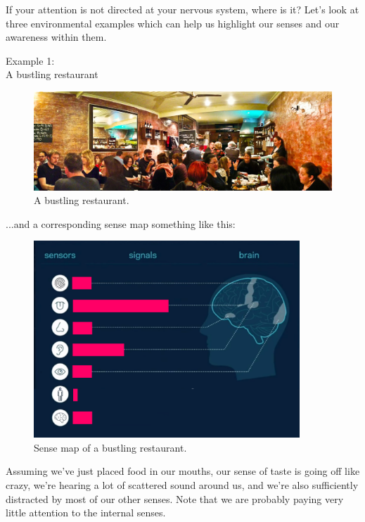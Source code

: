 \documentclass{article}
\begin{document}
If your attention is not directed at your nervous system, where is it? Let's look at three environmental examples which can help us highlight our senses and our awareness within them.

\pagebreak

\begin{center}
  \LARGE{Example 1:}\\
  \LARGE{A bustling restaurant}
\end{center}


\begin{figure}[h]
  \centering
  \includegraphics[width=\linewidth]{images/attention1-restaurant.jpg}
  \caption{A bustling restaurant.}
  \label{fig:bustling-restaurant}
\end{figure}

...and a corresponding sense map something like this:

\begin{figure}[h]
  \centering
  \includegraphics[width=10cm]{images/ma-noisy-restaurant.png}
  \caption{Sense map of a bustling restaurant.}
  \label{fig:sense-map-bustling-restaurant}
\end{figure}

Assuming we've just placed food in our mouths, our sense of taste is going off like crazy, we're hearing a lot of scattered sound around us, and we're also sufficiently distracted by most of our other senses. Note that we are probably paying very little attention to the internal senses.
\end{document}
